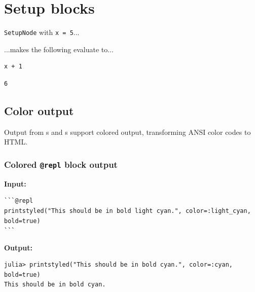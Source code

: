 \section{Setup blocks}



\label{5969831508618549664}{}


\texttt{SetupNode} with \texttt{x = 5}...





...makes the following evaluate to...




\begin{verbatim}
x + 1
\end{verbatim}


\begin{verbatim}
6
\end{verbatim}



\subsection{Color output}



\label{17347250707405175741}{}


Output from s and s support colored output, transforming ANSI color codes to HTML.



\subsubsection{Colored \texttt{@repl} block output}



\label{681009610151884915}{}


\textbf{Input:}




\begin{verbatim}
```@repl
printstyled("This should be in bold light cyan.", color=:light_cyan, bold=true)
```
\end{verbatim}



\textbf{Output:}




\begin{verbatim}
julia> printstyled("This should be in bold cyan.", color=:cyan, bold=true)
This should be in bold cyan.
\end{verbatim}



